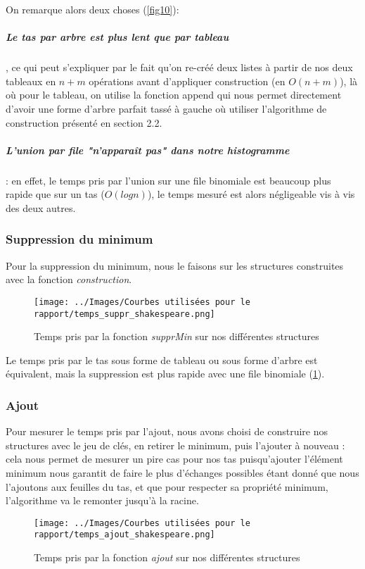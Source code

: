 \documentclass[12pt,a4paper]{article}
\begin{document}
On remarque alors deux choses (\ref{fig10}): 

\subparagraph{Le tas par arbre est plus lent que par tableau}, ce qui peut s'expliquer par le fait qu'on re-créé deux listes à partir de nos deux tableaux en $n+m$ opérations avant d'appliquer construction (en $O(n+m)$), là où pour le tableau, on utilise la fonction append qui nous permet directement d'avoir une forme d'arbre parfait tassé à gauche où utiliser l'algorithme de construction présenté en section 2.2.

\subparagraph{L'union par file "n'apparaît pas" dans notre histogramme} : en effet, le temps pris par l'union sur une file binomiale est beaucoup plus rapide que sur un tas ($O(log n)$), le temps mesuré est alors négligeable vis à vis des deux autres.

\subsubsection{Suppression du minimum}
Pour la suppression du minimum, nous le faisons sur les structures construites avec la fonction \textit{construction}.

\begin{figure}[hbtp]
\centering
\texttt{[image: ../Images/Courbes utilisées pour le rapport/temps\_suppr\_shakespeare.png]}
\caption{Temps pris par la fonction \textit{supprMin} sur nos différentes structures}
\label{fig11}
\end{figure}


Le temps pris par le tas sous forme de tableau ou sous forme d'arbre est équivalent, mais la suppression est plus rapide avec une file binomiale (\ref{fig11}).

\subsubsection{Ajout}

Pour mesurer le temps pris par l'ajout, nous avons choisi de construire nos structures avec le jeu de clés, en retirer le minimum, puis l'ajouter à nouveau : cela nous permet de mesurer un pire cas pour nos tas puisqu'ajouter l'élément minimum nous garantit de faire le plus d'échanges possibles étant donné que nous l'ajoutons aux feuilles du tas, et que pour respecter sa propriété minimum, l'algorithme va le remonter jusqu'à la racine.

\begin{figure}[hbtp]
\centering
\texttt{[image: ../Images/Courbes utilisées pour le rapport/temps\_ajout\_shakespeare.png]}
\caption{Temps pris par la fonction \textit{ajout} sur nos différentes structures}
\label{fig12}
\end{figure}
\end{document}
